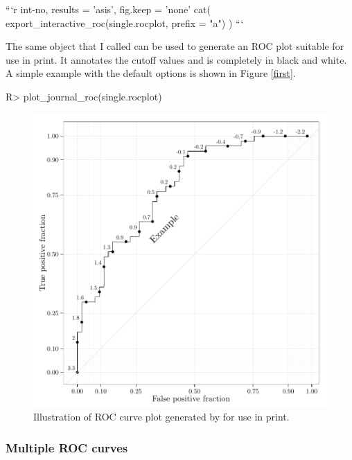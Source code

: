 \documentclass[codesnippet]{jss}
\begin{document}
\begin{Code}
```{r int-no, results = 'asis', fig.keep = 'none'}
cat(
  export_interactive_roc(single.rocplot, 
                        prefix = "a")
  )
```
\end{Code}

The same  object that I called  can be
used to generate an ROC plot suitable for use in print. It annotates the
cutoff values and is completely in black and white. A simple example
with the default options is shown in Figure \ref{first}.

\begin{Schunk}
\begin{Sinput}
R> plot_journal_roc(single.rocplot)
\end{Sinput}
\begin{figure}
\includegraphics{figure/print-1} \caption{Illustration of ROC curve plot generated by  for use in print. \label{first}}\label{fig:print}
\end{figure}
\end{Schunk}

\subsubsection{Multiple ROC curves}\label{multiple-roc-curves}
\end{document}
